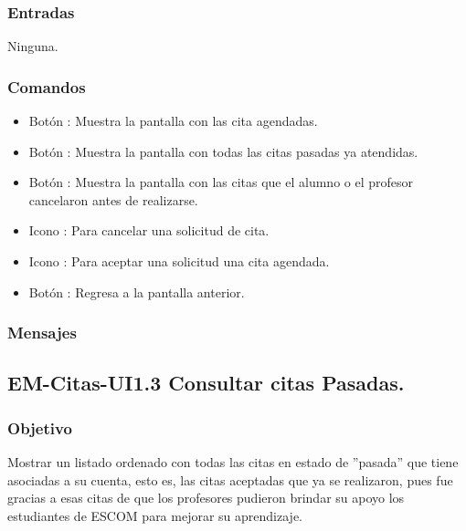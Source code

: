 \subsubsection{Entradas}
	\noindent
	Ninguna.

\subsubsection{Comandos}
	\begin{itemize}
		\item Botón : Muestra la pantalla con las cita agendadas.
		\item Botón : Muestra la pantalla con todas las citas pasadas ya atendidas.
		\item Botón : Muestra la pantalla con las citas que el alumno o el profesor cancelaron antes de realizarse.
		\item Icono : Para cancelar una solicitud de cita.
		\item Icono : Para aceptar una solicitud una cita agendada.
		\item Botón : Regresa a la pantalla anterior.
	\end{itemize}

\subsubsection{Mensajes}
	\begin{Citemize}
		\item {}
	\end{Citemize}

\pagebreak

\subsection{EM-Citas-UI1.3 Consultar citas Pasadas.}

\subsubsection{Objetivo}
	\noindent
	Mostrar un listado ordenado con todas las citas en estado de ''pasada'' que tiene asociadas a su cuenta, esto es, las citas aceptadas que ya se realizaron, pues fue gracias a esas citas de que los profesores pudieron brindar su apoyo los estudiantes de ESCOM para mejorar su aprendizaje.

